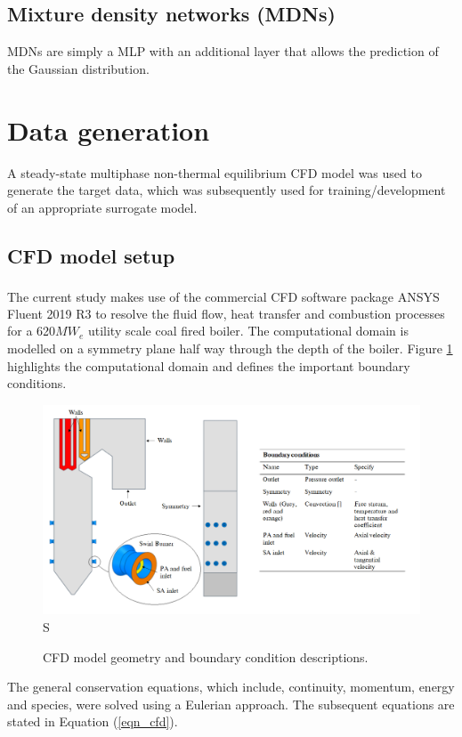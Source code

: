 \documentclass[a4paper,fleqn]{cas-sc}
\begin{document}
\subsection{Mixture density networks (MDNs)}
MDNs are simply a MLP with an additional layer that allows the prediction of the Gaussian distribution.


\section{Data generation}
A steady-state multiphase non-thermal equilibrium CFD model was used to generate the target data, which was subsequently used for training/development of an appropriate surrogate model.

\subsection{CFD model setup}
The current study makes use of the commercial CFD software package ANSYS\textsuperscript{\textregistered} Fluent 2019 R3 to resolve the fluid flow, heat transfer and combustion processes for a 620$MW_e$ utility scale coal fired boiler. The computational domain is modelled on a symmetry plane half way through the depth of the boiler. Figure \ref{fig_cfd_geom_bc} highlights the computational domain and defines the important boundary conditions.\\ 

\begin{figure}[h!]
	\centering
		\includegraphics[scale=0.5]{CFD_GEOMETRY}S
	  \caption{CFD model geometry and boundary condition descriptions.}\label{fig_cfd_geom_bc}
\end{figure}

The general conservation equations, which include, continuity, momentum, energy and species, were solved using a Eulerian approach. The subsequent equations are stated in Equation (\ref{eqn_cfd}).
\end{document}

